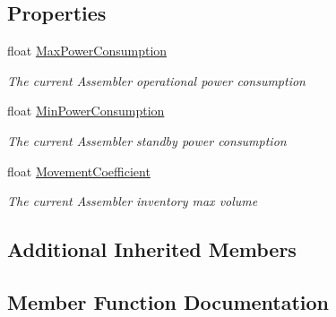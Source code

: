 \subsection*{Properties}
\begin{DoxyCompactItemize}
\item 
float \hyperlink{class_s_e_mod_a_p_i_1_1_a_p_i_1_1_definitions_1_1_cube_blocks_1_1_assembler_definition_ade0af6cb85b9db92febb227e66647266}{Max\+Power\+Consumption}
\begin{DoxyCompactList}\small\item\em The current Assembler operational power consumption \end{DoxyCompactList}\item 
float \hyperlink{class_s_e_mod_a_p_i_1_1_a_p_i_1_1_definitions_1_1_cube_blocks_1_1_assembler_definition_ae02ed07db6df073e81033ec21ad70234}{Min\+Power\+Consumption}
\begin{DoxyCompactList}\small\item\em The current Assembler standby power consumption \end{DoxyCompactList}\item 
float \hyperlink{class_s_e_mod_a_p_i_1_1_a_p_i_1_1_definitions_1_1_cube_blocks_1_1_assembler_definition_a6b65b70de1051432de8f47fcc65d0f6a}{Movement\+Coefficient}
\begin{DoxyCompactList}\small\item\em The current Assembler inventory max volume \end{DoxyCompactList}\end{DoxyCompactItemize}
\subsection*{Additional Inherited Members}


\subsection{Member Function Documentation}
\hypertarget{class_s_e_mod_a_p_i_1_1_a_p_i_1_1_definitions_1_1_cube_blocks_1_1_assembler_definition_a484a7093eff5b3b8f596f2d913dffad8}{}
